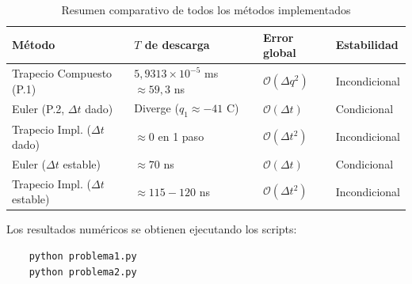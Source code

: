 \documentclass[12pt,a4paper]{article}
\begin{document}
\begin{table}[H]
    \centering
    \caption{Resumen comparativo de todos los métodos implementados}
    \label{tab:resumen}
    \begin{tabular}{llll}
        \toprule
        \textbf{Método} & \textbf{$T$ de descarga} & \textbf{Error global} & \textbf{Estabilidad} \\
        \midrule
        Trapecio Compuesto (P.1) & $5{,}9313\times10^{-5}$ ms $\approx 59{,}3$ ns & $\mathcal{O}(\Delta q^2)$ & Incondicional \\
        Euler (P.2, $\Delta t$ dado) & Diverge ($q_1 \approx -41$ C) & $\mathcal{O}(\Delta t)$ & Condicional \\
        Trapecio Impl. ($\Delta t$ dado) & $\approx 0$ en 1 paso & $\mathcal{O}(\Delta t^2)$ & Incondicional \\
        Euler ($\Delta t$ estable) & $\approx 70$ ns & $\mathcal{O}(\Delta t)$ & Condicional \\
        Trapecio Impl. ($\Delta t$ estable) & $\approx 115{-}120$ ns & $\mathcal{O}(\Delta t^2)$ & Incondicional \\
        \bottomrule
    \end{tabular}
\end{table}

Los resultados numéricos se obtienen ejecutando los scripts:
\begin{verbatim}
    python problema1.py
    python problema2.py
\end{verbatim}

\end{document}
